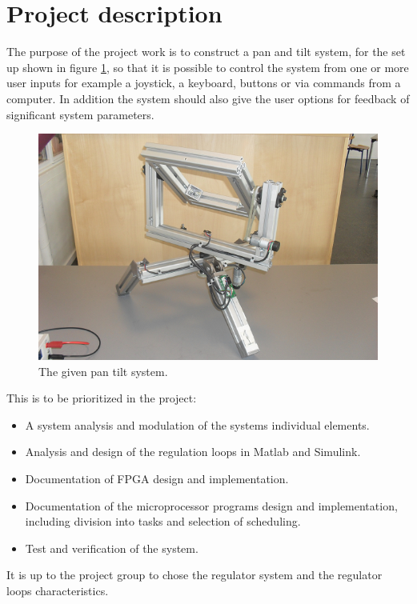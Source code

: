 
\section{Project description}
The purpose of the project work is to construct a pan and tilt system, for the set up shown in figure \ref{fig:pantilysystem}, so that it is possible to control the system from one or more user inputs for example a joystick, a keyboard, buttons or via commands from a computer. In addition the system should also give the user options for feedback of significant system parameters.

\begin{figure}[htb]
	\centering
	\includegraphics[width=\textwidth]{graphics/pantiltsystem.png} %
	\caption{The given pan tilt system.}
	\label{fig:pantilysystem}
\end{figure}

This is to be prioritized in the project:
\begin{itemize}
\item A system analysis and modulation of the systems individual elements.
\item Analysis and design of the regulation loops in Matlab and Simulink.
\item Documentation of FPGA design and implementation.
\item Documentation of the microprocessor programs design and implementation, including division into tasks and selection of scheduling.
\item Test and verification of the system.
\end{itemize}

It is up to the project group to chose the regulator system and the regulator loops characteristics.

